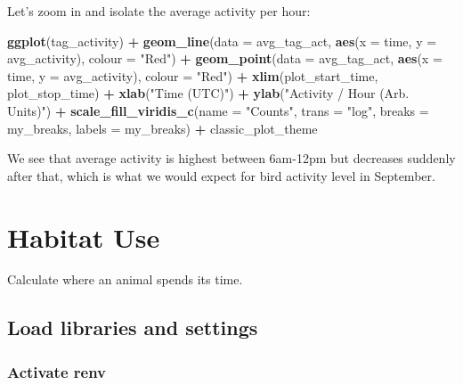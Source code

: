 \documentclass[
]{book}
\newenvironment{Shaded}{\begin{snugshade}}{\end{snugshade}}
\newcommand{\AttributeTok}[1]{\textcolor[rgb]{0.13,0.29,0.53}{#1}}
\newcommand{\FunctionTok}[1]{\textcolor[rgb]{0.13,0.29,0.53}{\textbf{#1}}}
\newcommand{\NormalTok}[1]{#1}
\newcommand{\SpecialCharTok}[1]{\textcolor[rgb]{0.81,0.36,0.00}{\textbf{#1}}}
\newcommand{\StringTok}[1]{\textcolor[rgb]{0.31,0.60,0.02}{#1}}
\begin{document}
Let's zoom in and isolate the average activity per hour:

\begin{Shaded}
\begin{Highlighting}[]
\FunctionTok{ggplot}\NormalTok{(tag\_activity) }\SpecialCharTok{+}
  \FunctionTok{geom\_line}\NormalTok{(}\AttributeTok{data =}\NormalTok{ avg\_tag\_act, }
            \FunctionTok{aes}\NormalTok{(}\AttributeTok{x =}\NormalTok{ time, }
                \AttributeTok{y =}\NormalTok{ avg\_activity),}
            \AttributeTok{colour =} \StringTok{"Red"}\NormalTok{) }\SpecialCharTok{+}
  \FunctionTok{geom\_point}\NormalTok{(}\AttributeTok{data =}\NormalTok{ avg\_tag\_act, }
             \FunctionTok{aes}\NormalTok{(}\AttributeTok{x =}\NormalTok{ time, }
                 \AttributeTok{y =}\NormalTok{ avg\_activity), }
             \AttributeTok{colour =} \StringTok{"Red"}\NormalTok{) }\SpecialCharTok{+}
  \FunctionTok{xlim}\NormalTok{(plot\_start\_time, plot\_stop\_time) }\SpecialCharTok{+}
  \FunctionTok{xlab}\NormalTok{(}\StringTok{"Time (UTC)"}\NormalTok{) }\SpecialCharTok{+}
  \FunctionTok{ylab}\NormalTok{(}\StringTok{"Activity / Hour (Arb. Units)"}\NormalTok{) }\SpecialCharTok{+}
  \FunctionTok{scale\_fill\_viridis\_c}\NormalTok{(}\AttributeTok{name =} \StringTok{"Counts"}\NormalTok{, }
                       \AttributeTok{trans =} \StringTok{"log"}\NormalTok{, }
                       \AttributeTok{breaks =}\NormalTok{ my\_breaks, }
                       \AttributeTok{labels =}\NormalTok{ my\_breaks) }\SpecialCharTok{+}
\NormalTok{  classic\_plot\_theme}
\end{Highlighting}
\end{Shaded}

We see that average activity is highest between 6am-12pm but decreases suddenly after that, which is what we would expect for bird activity level in September.

\chapter{Habitat Use}\label{habitat-use}

Calculate where an animal spends its time.

\section{Load libraries and settings}\label{load-libraries-and-settings}

\subsection{Activate renv}\label{activate-renv}
\end{document}
